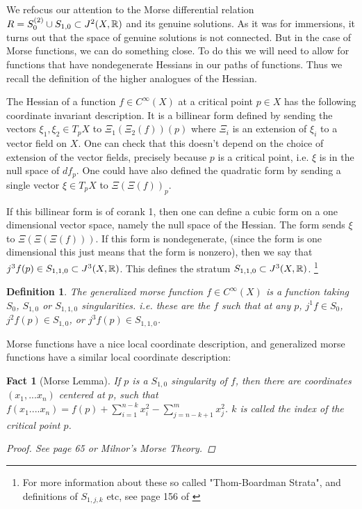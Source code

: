 \documentclass{article}
\newtheorem{fact}[theorem]{Fact}
\newtheorem{definition}[theorem]{Definition}
\newtheorem{proposed work}[theorem]{Proposed Work}
\begin{document}
\section{}

We refocus our attention to the Morse differential relation $R=S^{(2)}_0 \cup S_{1,0} \subset J^2(X,\mathbb R)$ and its genuine solutions.  As it was for immersions, it turns out that the space of genuine solutions is not connected.  But in the case of Morse functions, we can do something close.  To do this we will need to allow for functions that have nondegenerate Hessians in our paths of functions. Thus we recall the definition of the higher analogues of the Hessian.

The Hessian of a function $f \in C^\infty(X)$ at a critical point $p \in X$ has the following coordinate invariant description.  It is a billinear form defined by sending the vectors $\xi_1, \xi_2 \in T_pX$ to $\Xi_1(\Xi_2(f))(p)$ where $\Xi_i$ is an extension of $\xi_i$ to a vector field on $X$.  One can check that this doesn't depend on the choice of extension of the vector fields, precisely because $p$ is a critical point, i.e. $\xi$ is in the null space of $df_p$.  One could have also defined the quadratic form by sending a single vector $\xi \in T_pX$ to $\Xi(\Xi(f))_p$.

If this billinear form is of corank 1, then one can define a cubic form on a one dimensional vector space, namely the null space of the Hessian.  The form sends $\xi$ to $\Xi(\Xi(\Xi(f)))$.  If this form is nondegenerate, (since the form is one dimensional this just means that the form is nonzero), then we say that $j^3f(p) \in S_{1,1,0}\subset J^3(X,\mathbb R)$.  This defines the stratum $S_{1,1,0} \subset J^3(X,\mathbb R)$.   \footnote{ For more information about these so called "Thom-Boardman Strata", and definitions of $S_{1,j,k}$ etc, see page 156 of \cite{strata}}

\begin{definition}
The generalized morse function $f \in C^\infty(X)$ is a function taking $S_0$, $S_{1,0}$ or $S_{1,1,0}$ singularities.  i.e. these are the $f$ such that at any $p$, $j^1f \in S_0$, $j^2f(p) \in S_{1,0}$, or $j^3f(p) \in S_{1,1,0}$.
\end{definition}

Morse functions have a nice local coordinate description, and generalized morse functions have a similar local coordinate description:

\begin{fact}[Morse Lemma]

If $p$ is a $S_{1,0}$ singularity of $f$, then there are coordinates $(x_1,...x_n)$ centered at $p$, such that $f(x_1....x_n)=f(p)+ \sum_{i=1}^{n-k} x_i^2- \sum_{j=n-k+1}^m x_j^2$.  $k$ is called the index of the critical point $p$.

\begin{proof}
See \cite{strata} page 65 or Milnor's Morse Theory.
\end{proof}
\end{fact}
\end{document}

